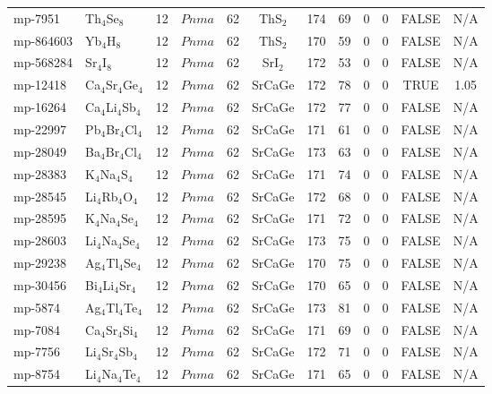{\begin{longtable}{llcccccccccc}
    mp-7951 & Th$_{4}$Se$_{8}$ & 12    & $Pnma$ & 62    & ThS$_{2}$ & 174   & 69    & 0     & 0     & FALSE & N/A \\
    mp-864603 & Yb$_{4}$H$_{8}$ & 12    & $Pnma$ & 62    & ThS$_{2}$ & 170   & 59    & 0     & 0     & FALSE & N/A \\
    mp-568284 & Sr$_{4}$I$_{8}$ & 12    & $Pnma$ & 62    & SrI$_{2}$ & 172   & 53    & 0     & 0     & FALSE & N/A \\
    mp-12418 & Ca$_{4}$Sr$_{4}$Ge$_{4}$ & 12    & $Pnma$ & 62    & SrCaGe & 172   & 78    & 0     & 0     & TRUE  & 1.05  \\
    mp-16264 & Ca$_{4}$Li$_{4}$Sb$_{4}$ & 12    & $Pnma$ & 62    & SrCaGe & 172   & 77    & 0     & 0     & FALSE & N/A \\
    mp-22997 & Pb$_{4}$Br$_{4}$Cl$_{4}$ & 12    & $Pnma$ & 62    & SrCaGe & 171   & 61    & 0     & 0     & FALSE & N/A \\
    mp-28049 & Ba$_{4}$Br$_{4}$Cl$_{4}$ & 12    & $Pnma$ & 62    & SrCaGe & 173   & 63    & 0     & 0     & FALSE & N/A \\
    mp-28383 & K$_{4}$Na$_{4}$S$_{4}$ & 12    & $Pnma$ & 62    & SrCaGe & 171   & 74    & 0     & 0     & FALSE & N/A \\
    mp-28545 & Li$_{4}$Rb$_{4}$O$_{4}$ & 12    & $Pnma$ & 62    & SrCaGe & 172   & 68    & 0     & 0     & FALSE & N/A \\
    mp-28595 & K$_{4}$Na$_{4}$Se$_{4}$ & 12    & $Pnma$ & 62    & SrCaGe & 171   & 72    & 0     & 0     & FALSE & N/A \\
    mp-28603 & Li$_{4}$Na$_{4}$Se$_{4}$ & 12    & $Pnma$ & 62    & SrCaGe & 173   & 75    & 0     & 0     & FALSE & N/A \\
    mp-29238 & Ag$_{4}$Tl$_{4}$Se$_{4}$ & 12    & $Pnma$ & 62    & SrCaGe & 170   & 75    & 0     & 0     & FALSE & N/A \\
    mp-30456 & Bi$_{4}$Li$_{4}$Sr$_{4}$ & 12    & $Pnma$ & 62    & SrCaGe & 170   & 65    & 0     & 0     & FALSE & N/A \\
    mp-5874 & Ag$_{4}$Tl$_{4}$Te$_{4}$ & 12    & $Pnma$ & 62    & SrCaGe & 173   & 81    & 0     & 0     & FALSE & N/A \\
    mp-7084 & Ca$_{4}$Sr$_{4}$Si$_{4}$ & 12    & $Pnma$ & 62    & SrCaGe & 171   & 69    & 0     & 0     & FALSE & N/A \\
    mp-7756 & Li$_{4}$Sr$_{4}$Sb$_{4}$ & 12    & $Pnma$ & 62    & SrCaGe & 172   & 71    & 0     & 0     & FALSE & N/A \\
    mp-8754 & Li$_{4}$Na$_{4}$Te$_{4}$ & 12    & $Pnma$ & 62    & SrCaGe & 171   & 65    & 0     & 0     & FALSE & N/A \\

\end{longtable}}
